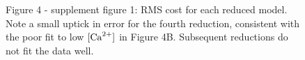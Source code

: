 \documentclass{article}
\newcommand\ca{\rm{Ca}^{2+}}
\begin{document}
\begin{figure}
\begin{center}
	\begin{subfigure}[b]{0.48\linewidth}
	\centering

\end{subfigure}
\end{center}
\captionsetup{labelformat=empty}
\caption{Figure 4 - supplement figure 1: RMS cost for each reduced model.  Note a small uptick in error for the fourth reduction, consistent with the poor fit to low $[\ca]$ in Figure 4B.  Subsequent reductions do not fit the data well.}
\end{figure}

\addtocounter{figure}{-1}

\pagebreak

\end{document}

